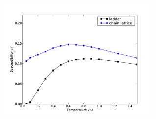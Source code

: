 \href{http://alps.comp-phys.org/vistrails/download.php?getvt=10&db=vistrails&host=alps.ethz.ch&port=3306&tag=&execute=True&showspreadsheetonly=True&embedWorkflow=False&version=163}{\includegraphics[width=8cm]{vistrails_images/alps.ethz.ch_vistrails_3306_10_163_pdf/None_None.pdf}
}